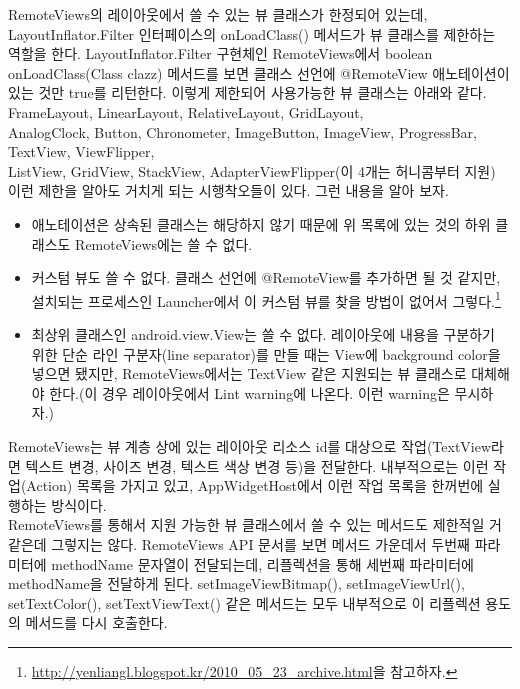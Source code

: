 RemoteViews의 레이아웃에서 쓸 수 있는 뷰 클래스가 한정되어 있는데, LayoutInflator.Filter 인터페이스의  onLoadClass() 메서드가 뷰 클래스를 제한하는 역할을 한다. LayoutInflator.Filter 구현체인 RemoteViews에서 boolean onLoadClass(Class clazz) 메서드를 보면 클래스 선언에 @RemoteView 애노테이션이 있는 것만 true를 리턴한다.
이렇게 제한되어 사용가능한 뷰 클래스는 아래와 같다.\\

FrameLayout, LinearLayout, RelativeLayout, GridLayout,\\
AnalogClock, Button, Chronometer, ImageButton, ImageView, ProgressBar, TextView, ViewFlipper,\\
ListView, GridView, StackView, AdapterViewFlipper(이 4개는 허니콤부터 지원)\\

이런 제한을 알아도 거치게 되는 시행착오들이 있다. 그런 내용을 알아 보자.
\begin{itemize}
\item 애노테이션은 상속된 클래스는 해당하지 않기 때문에 위 목록에 있는 것의 하위 클래스도 RemoteViews에는 쓸 수 없다.
\item 커스텀 뷰도 쓸 수 없다. 클래스 선언에 @RemoteView를 추가하면 될 것 같지만, 설치되는 프로세스인 Launcher에서 이 커스텀 뷰를 찾을 방법이 없어서 그렇다.\footnote{\url{http://yenliangl.blogspot.kr/2010\_05\_23\_archive.html}을 참고하자.}
\item 최상위 클래스인 android.view.View는 쓸 수 없다. 레이아웃에 내용을 구분하기 위한 단순 라인 구분자(line separator)를 만들 때는 View에 background color을 넣으면 됐지만, RemoteViews에서는 TextView 같은 지원되는 뷰 클래스로 대체해야 한다.(이 경우 레이아웃에서 Lint warning에 나온다. 이런 warning은 무시하자.)
\end{itemize}

RemoteViews는 뷰 계층 상에 있는 레이아웃 리소스 id를 대상으로 작업(TextView라면 텍스트 변경, 사이즈 변경, 텍스트 색상 변경 등)을 전달한다.
내부적으로는 이런 작업(Action) 목록을 가지고 있고, AppWidgetHost에서 이런 작업 목록을 한꺼번에 실행하는 방식이다.\\

RemoteViews를 통해서 지원 가능한 뷰 클래스에서 쓸 수 있는 메서드도 제한적일 거 같은데 그렇지는 않다. 
RemoteViews API 문서를 보면 메서드 가운데서 두번째 파라미터에 methodName 문자열이 전달되는데, 리플렉션을 통해 세번째 파라미터에 methodName을 전달하게 된다.
setImageViewBitmap(), setImageViewUrl(), setTextColor(), setTextViewText() 같은 메서드는 모두 내부적으로 이 리플렉션 용도의 메서드를 다시 호출한다.\\

